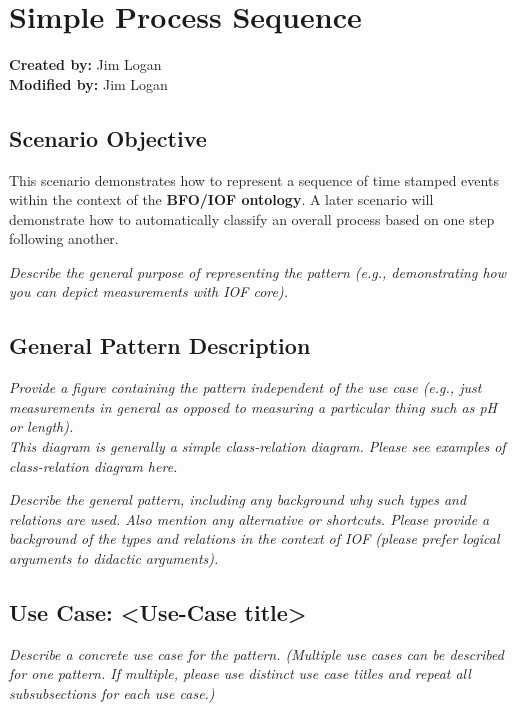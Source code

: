 \label{chapter-scenario-processes}

\section*{Simple Process Sequence}

\textbf{Created by:} Jim Logan \\
\textbf{Modified by:} Jim Logan \\

\subsection*{Scenario Objective}
This scenario demonstrates how to represent a sequence of time stamped events within the context of the \textbf{BFO/IOF ontology}. A later scenario will demonstrate how to automatically classify an overall process based on one step following another.

\textit{ 
Describe the general purpose of representing the pattern (e.g., demonstrating how you can depict measurements with IOF core).}

\subsection*{General Pattern Description}

\textit{  
Provide a figure containing the pattern independent of the use case (e.g., just measurements in general as opposed to measuring a particular thing such as pH or length). \\
\noindent \textit{This diagram is generally a simple class-relation diagram. Please see examples of class-relation diagram here.}
  }

\textit{ 
Describe the general pattern, including any background why such types and relations are used. Also mention any alternative or shortcuts. Please provide a background of the types and relations in the context of IOF (please prefer logical arguments to didactic arguments).
}


\subsection*{Use Case: <Use-Case title>}
 \textit{ 
Describe a concrete use case for the pattern. (Multiple use cases can be described for one pattern. If multiple, please use distinct use case titles and repeat all subsubsections for each use case.)
  }


